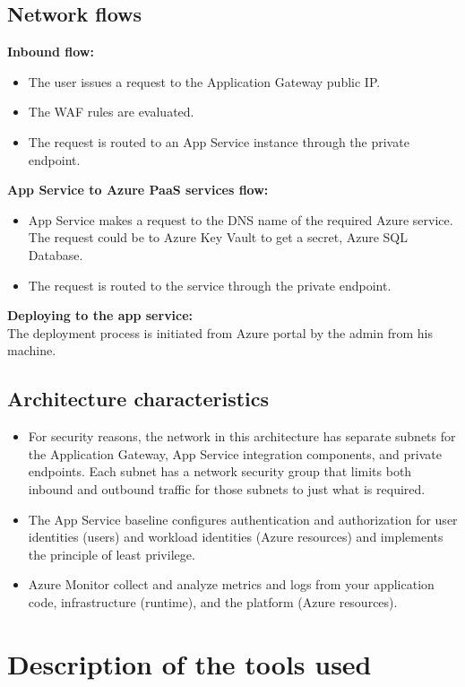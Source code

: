 \subsection*{Network flows}
\textbf{Inbound flow:}
\begin{itemize}
    \item The user issues a request to the Application Gateway public IP.
    \item The WAF rules are evaluated.
    \item The request is routed to an App Service instance through the private endpoint.
\end{itemize}
\textbf{App Service to Azure PaaS services flow:}
\begin{itemize}
    \item App Service makes a request to the DNS name of the required Azure service. The request could be to Azure Key Vault to get a secret, Azure SQL Database.
    \item The request is routed to the service through the private endpoint.
\end{itemize}

\textbf{Deploying to the app service:} \\
The deployment process is initiated from Azure portal by the admin from his machine.

\subsection*{Architecture characteristics}
\begin{itemize}
    \item For security reasons, the network in this architecture has separate subnets for the Application Gateway, App Service integration components, and private endpoints. Each subnet has a network security group that limits both inbound and outbound traffic for those subnets to just what is required.
    \item The App Service baseline configures authentication and authorization for user identities (users) and workload identities (Azure resources) and implements the principle of least privilege.
    \item Azure Monitor collect and analyze metrics and logs from your application code, infrastructure (runtime), and the platform (Azure resources).
\end{itemize}
\section{Description of the tools used}
